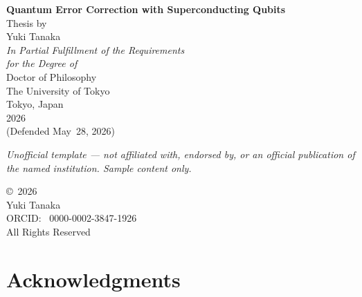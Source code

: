 \documentclass[11pt,twoside,openright]{book}
\begin{document}
\begin{titlepage}
\thispagestyle{empty}
\begin{center}

\vspace*{0.15\textheight}

{\Huge\bfseries Quantum Error Correction with Superconducting Qubits}\\[36pt]

{\LARGE Thesis by}\\[18pt]

{\LARGE Yuki Tanaka}\\[48pt]

{\large\textit{In Partial Fulfillment of the Requirements\\[4pt]
for the Degree of}}\\[18pt]

{\LARGE Doctor of Philosophy}\\[48pt]

{\large The University of Tokyo}\\[6pt]
{\large Tokyo, Japan}\\[30pt]

{\large 2026}\\[18pt]

{\normalsize\color{MidGray}(Defended May~28, 2026)}

\vfill
{\footnotesize\itshape Unofficial template --- not affiliated with, endorsed by, or an official publication of the named institution. Sample content only.}
\end{center}
\end{titlepage}

\cleardoublepage
\thispagestyle{empty}
\vspace*{0.4\textheight}

\begin{center}
{\large\copyright\ 2026}\\[12pt]
{\large Yuki Tanaka}\\[12pt]
{\normalsize ORCID: \faOrcid\ 0000-0002-3847-1926}\\[24pt]
{\normalsize All Rights Reserved}
\end{center}

\cleardoublepage
\chapter*{Acknowledgments}
\end{document}
